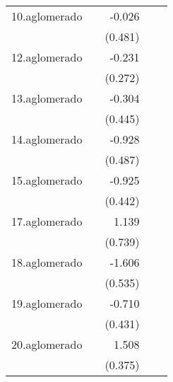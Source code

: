 {\begin{longtable}{l*{4}{D{.}{.}{-1}}}
\addlinespace
10.aglomerado&                     &      -0.026         &                     &                     \\
            &                     &     (0.481)         &                     &                     \\
\addlinespace
12.aglomerado&                     &      -0.231         &                     &                     \\
            &                     &     (0.272)         &                     &                     \\
\addlinespace
13.aglomerado&                     &      -0.304         &                     &                     \\
            &                     &     (0.445)         &                     &                     \\
\addlinespace
14.aglomerado&                     &      -0.928         &                     &                     \\
            &                     &     (0.487)         &                     &                     \\
\addlinespace
15.aglomerado&                     &      -0.925\sym{*}  &                     &                     \\
            &                     &     (0.442)         &                     &                     \\
\addlinespace
17.aglomerado&                     &       1.139         &                     &                     \\
            &                     &     (0.739)         &                     &                     \\
\addlinespace
18.aglomerado&                     &      -1.606\sym{**} &                     &                     \\
            &                     &     (0.535)         &                     &                     \\
\addlinespace
19.aglomerado&                     &      -0.710         &                     &                     \\
            &                     &     (0.431)         &                     &                     \\
\addlinespace
20.aglomerado&                     &       1.508\sym{***}&                     &                     \\
            &                     &     (0.375)         &                     &                     \\

\end{longtable}}
